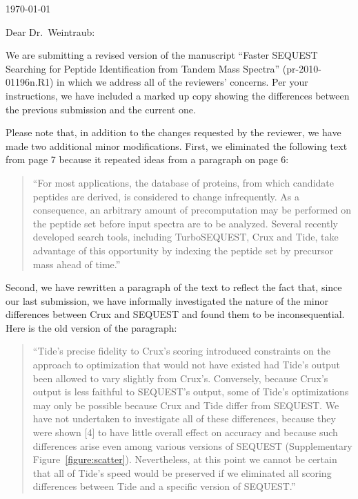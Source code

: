 \documentclass{article}
\begin{document}
\hspace*{3.0in}\today

\vspace*{3ex}

\noindent
Dear Dr.\ Weintraub:

\vspace*{1ex}

We are submitting a revised version of the manuscript ``Faster SEQUEST
Searching for Peptide Identification from Tandem Mass Spectra''
(pr-2010-01196n.R1) in which we address all of the reviewers'
concerns. Per your instructions, we have included a marked up copy
showing the differences between the previous submission and the
current one.

Please note that, in addition to the changes requested by the
reviewer, we have made two additional minor modifications.  First, we
eliminated the following text from page 7 because it repeated ideas
from a paragraph on page 6:
\begin{quotation}
``For most applications, the database of proteins, from which
  candidate peptides are derived, is considered to change
  infrequently. As a consequence, an arbitrary amount of
  precomputation may be performed on the peptide set before input
  spectra are to be analyzed.  Several recently developed search
  tools, including TurboSEQUEST, Crux and Tide, take advantage of this
  opportunity by indexing the peptide set by precursor mass ahead of
  time.''
\end{quotation}
Second, we have rewritten a paragraph of the text to reflect the fact
that, since our last submission, we have informally investigated the
nature of the minor differences between Crux and SEQUEST and found
them to be inconsequential.  Here is the old version of the paragraph:
\begin{quotation}
``Tide's precise fidelity to Crux's scoring introduced
constraints on the approach to optimization that would not have
existed had Tide's output been allowed to vary slightly from
Crux's. Conversely, because Crux's output is less faithful to
SEQUEST's output, some of Tide's optimizations may only be possible
because Crux and Tide differ from SEQUEST. We have not undertaken to
investigate all of these differences, because they were shown
[4] to have little overall effect on accuracy and
because such differences arise even among various versions of SEQUEST
(Supplementary Figure~\ref{figure:scatter}).  Nevertheless, at this
point we cannot be certain that all of Tide's speed would be preserved
if we eliminated all scoring differences between Tide and a specific
version of SEQUEST.''
\end{quotation}
\end{document}
